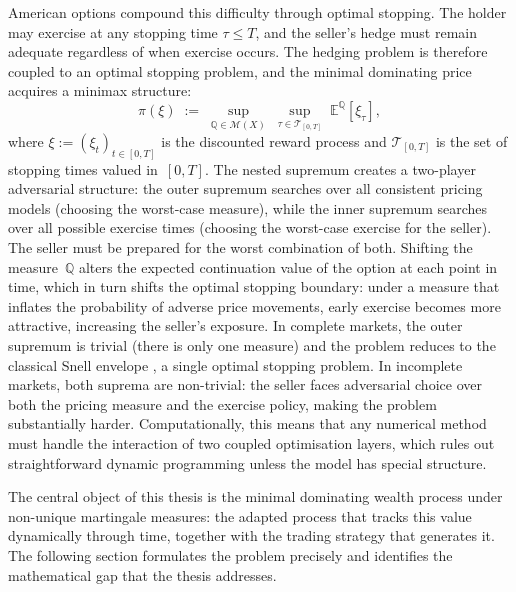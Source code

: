 American options compound this difficulty through optimal stopping.  The
holder may exercise at any stopping time $\tau \le T$, and the seller's
hedge must remain adequate regardless of when exercise occurs.  The hedging
problem is therefore coupled to an optimal stopping problem, and the
minimal dominating price acquires a minimax structure:
\begin{equation}
\label{eq:american_price_intro}
\pi(\xi)
\;:=\;
\sup_{\mathbb{Q} \in \mathcal{M}(X)}
\;\sup_{\tau \in \mathcal{T}_{[0,T]}}
\;\mathbb{E}^{\mathbb{Q}}[\xi_\tau],
\end{equation}
where $\xi := (\xi_t)_{t \in [0,T]}$ is the discounted reward process and
$\mathcal{T}_{[0,T]}$ is the set of stopping times valued in~$[0,T]$.
The nested supremum creates a two-player adversarial structure: the outer
supremum searches over all consistent pricing models (choosing the
worst-case measure), while the inner supremum searches over all possible
exercise times (choosing the worst-case exercise for the seller).  The
seller must be prepared for the worst combination of both.  Shifting the
measure~$\mathbb{Q}$ alters the expected continuation value of the option
at each point in time, which in turn shifts the optimal stopping boundary:
under a measure that inflates the probability of adverse price movements,
early exercise becomes more attractive, increasing the seller's exposure.
In complete markets, the outer supremum is trivial (there is only one
measure) and the problem reduces to the classical Snell envelope
\citep{Bensoussan1984, Karatzas1988}, a single optimal stopping problem.
In incomplete markets, both suprema are non-trivial: the seller faces
adversarial choice over both the pricing measure and the exercise policy,
making the problem substantially harder.  Computationally, this means that
any numerical method must handle the interaction of two coupled
optimisation layers, which rules out straightforward dynamic programming
unless the model has special structure.

The central object of this thesis is the minimal dominating wealth process
under non-unique martingale measures: the adapted process that tracks this
value dynamically through time, together with the trading strategy that
generates it.  The following section formulates the problem precisely and
identifies the mathematical gap that the thesis addresses.


